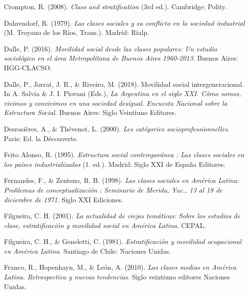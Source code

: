 \documentclass[
]{article}
\newlength{\cslhangindent}
\newlength{\cslentryspacingunit} %
\newenvironment{CSLReferences}[2] %
 {%
  \setlength{\parindent}{0pt}
  \ifodd #1
  \let\oldpar\par
  \def\par{\hangindent=\cslhangindent\oldpar}
  \fi
  \setlength{\parskip}{#2\cslentryspacingunit}
 }%
 {}
\begin{document}
\begin{CSLReferences}{1}{0}
\leavevmode{}%
Crompton, R. (2008). \emph{Class and stratification} (3rd ed.). Cambridge: Polity.

\leavevmode{}%
Dahrendorf, R. (1979). \emph{Las clases sociales y su conflicto en la sociedad industrial} (M. Troyano de los Ríos, Trans.). Madrid: Rialp.

\leavevmode{}%
Dalle, P. (2016). \emph{Movilidad social desde las clases populares: Un estudio sociológico en el área {Metropolitana} de {Buenos} {Aires} 1960-2013}. Buenos Aires: IIGG-CLACSO.

\leavevmode{}%
Dalle, P., Jorrat, J. R., \& Riveiro, M. (2018). Movilidad social intergeneracional. In A. Salvia \& J. I. Piovani (Eds.), \emph{La {Argentina} en el siglo {XXI}. {Cómo} somos, vivimos y convivimos en una sociedad desigual. {Encuesta} {Nacional} sobre la {Estructura} {Social}.} Buenos Aires: Siglo Veintiuno Editores.

\leavevmode{}%
Desrosières, A., \& Thévenot, L. (2000). \emph{Les catégories socioprofessionnelles}. Paris: Ed. la Découverte.

\leavevmode{}%
Feito Alonso, R. (1995). \emph{Estructura social contemporánea : Las clases sociales en los países industrializados} (1. ed.). Madrid: Siglo XXI de España Editores.

\leavevmode{}%
Fernandes, F., \& Zenteno, R. B. (1998). \emph{Las clases sociales en {América} {Latina}: Problemas de conceptualización : Seminario de {Merida}, {Yuc}., 13 al 18 de diciembre de 1971}. Siglo XXI Ediciones.

\leavevmode{}%
Filgueira, C. H. (2001). \emph{La actualidad de viejas temáticas: Sobre los estudios de clase, estratificación y movilidad social en {América} {Latina}}. CEPAL.

\leavevmode{}%
Filgueira, C. H., \& Geneletti, C. (1981). \emph{Estratificación y movilidad ocupacional en {América} {Latina}}. Santiago de Chile: Naciones Unidas.

\leavevmode{}%
Franco, R., Hopenhayn, M., \& León, A. (2010). \emph{Las clases medias en {América} {Latina}. {Retrospectiva} y nuevas tendencias}. Siglo veintiuno editores Naciones Unidas.


\end{CSLReferences}
\end{document}
